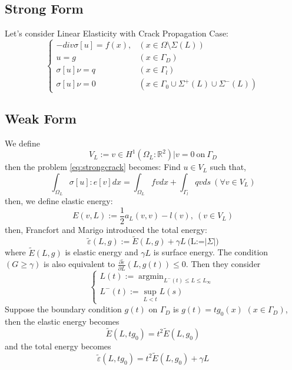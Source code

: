 \documentclass[a4paper,11pt]{article}
\newcommand{\R}{\mathbb{R}}
\DeclareMathOperator*{\argmin}{argmin}
\begin{document}
\subsection{Strong Form}
Let's consider Linear Elasticity with Crack Propagation Case:
\begin{equation}\label{eq:strongcrack}
\begin{cases}
-div \sigma[u] = f(x), & (x\in \Omega \setminus \Sigma(L))\\
u = g & (x \in \Gamma_D)\\
\sigma[u] \nu = q & (x \in \Gamma_l)\\
\sigma[u] \nu = 0 & (x \in\Gamma_0 \cup \Sigma^+(L) \cup \Sigma^-(L))
\end{cases}
\end{equation}
\subsection{Weak Form}
We define $$V_L := {v \in H^1(\Omega_L : \R^2)| v=0}\ \text{on}\ \Gamma_D$$
then the problem \eqref{eq:strongcrack} becomes:
Find $u\in V_L$ such that,
\begin{equation}\label{eq:weakcrack}
\int_{\Omega_L} \sigma[u] : e[v] dx = \int_{\Omega_L} fv dx + \int_{\Gamma_l} qv ds\ (\forall  v \in V_L)
\end{equation}
then, we define elastic energy:
\begin{equation}\label{eq:elasticen}
E(v,L) := \frac{1}{2}a_L(v,v) - l(v),\ (v\in V_L)
\end{equation}
then, Francfort and Marigo introduced the total energy:
\begin{equation}
\tilde{\varepsilon}(L,g) := \tilde{E}(L,g) + \gamma L \ \text{(L:=$|\Sigma|$)}
\end{equation}
where $\tilde{E}(L,g)$ is elastic energy and $\gamma L$ is surface energy. The condition $(G\geq \gamma)$ is also equivalent to $\frac{\partial \tilde{\varepsilon}}{\partial L}(L,g(t))\leq 0$.
Then they consider
\begin{equation}
\begin{cases}
L(t) := \argmin_{L^-(t)\leq L \leq L_\infty}\\
L^-(t) := \sup_{L<t} L(s)
\end{cases}
\end{equation}
Suppose the boundary condition $g(t)$ on $\Gamma_D$ is $g(t)=tg_0(x)$ $(x\in \Gamma_D)$, then the elastic energy becomes
\begin{equation}
\tilde{E}(L,tg_0) = t^2\tilde{E}(L,g_0)
\end{equation}
and the total energy becomes
\begin{equation}
\tilde{\varepsilon}(L,tg_0) = t^2 \tilde{E}(L,g_0) + \gamma L
\end{equation}
\end{document}
